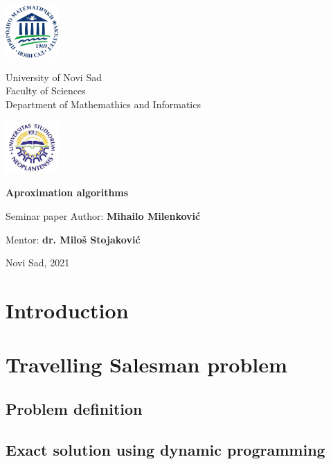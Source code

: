 \documentclass[a4paper]{article}
\newcommand{\autor}{ Mihailo Milenković }
\newcommand{\naslov}{Aproximation algorithms}
\newcommand{\datum}{Novi Sad, 2021}
\newcommand{\mentor}{dr. Miloš Stojaković}
\begin{document}
	\begin{center}
		
		\includegraphics[width=2cm]{grbPMF}\hfill
		\parbox[b]{45ex}{\centering 
		University of Novi Sad\\
			Faculty of Sciences\\
			Department of Mathemathics and Informatics}\hfill 
		\includegraphics[width=2cm]{grbUNS}
		
		\vspace{22ex}
				
		{\Huge {\bf \setlength{\baselineskip}{1.5\baselineskip}\naslov}}
		
 		\vspace{4ex}
 		Seminar paper
 		\vfill	
 		{\Large Author:}
		{\Large {\bf \autor}}
		\vspace{10ex}
		
		{\Large Mentor:}
		{\Large  \textbf{\mentor}}
		\vspace{5ex}
	
		
		\datum
		
	\end{center}
	\thispagestyle{empty}
	\newpage	
	\vfill

	\thispagestyle{empty}
	\tableofcontents
	\newpage
	
	\section{Introduction}
    
   \section{Travelling Salesman problem}
   
   \subsection{Problem definition}
   
   \subsection{Exact solution using dynamic programming}
   
\end{document}
